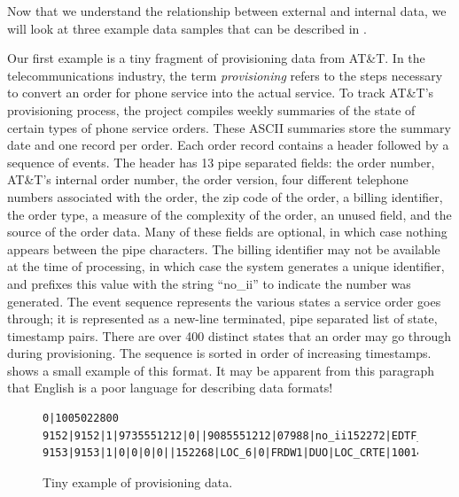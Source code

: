 \documentclass{entcs}
\begin{document}
Now that we understand the relationship between external and internal
data, we will look at three example data samples that can be described
in \pads{}.

Our first example is a tiny fragment of provisioning data from AT\&T.
In the telecommunications industry, the term \textit{provisioning}
refers to the steps necessary to convert an order for phone service
into the actual service.  To track AT\&T's provisioning process, the
\dibbler{} project compiles weekly summaries of the state of certain
types of phone service orders.  These ASCII summaries store the
summary date and one record per order.  Each order record contains a
header followed by a sequence of events.  The header has 13 pipe
separated fields: the order number, AT\&T's internal order number, the
order version, four different telephone numbers associated with the
order, the zip code of the order, a billing identifier, the order
type, a measure of the complexity of the order, an unused field, and
the source of the order data.  Many of these fields are optional, in
which case nothing appears between the pipe characters.  The billing
identifier may not be available at the time of processing, in which
case the system generates a unique identifier, and prefixes this value
with the string ``no\_ii'' to indicate the number was generated. The
event sequence represents the various states a service order goes
through; it is represented as a new-line terminated, pipe separated
list of state, timestamp pairs.  There are over 400 distinct states
that an order may go through during provisioning.  The sequence is
sorted in order of increasing timestamps.
 shows a small example of this format.
It may be apparent from this paragraph that English is a poor
language for describing data formats!

\begin{figure}
\begin{small}
\begin{verbatim}
0|1005022800
9152|9152|1|9735551212|0||9085551212|07988|no_ii152272|EDTF_6|0|APRL1|DUO|10|1000295291
9153|9153|1|0|0|0|0||152268|LOC_6|0|FRDW1|DUO|LOC_CRTE|1001476800|LOC_OS_10|1001649601
\end{verbatim}
\caption{Tiny example of \dibbler{} provisioning data.}
\label{fig:dibbler-records}
\end{small}
\end{figure}
\end{document}
